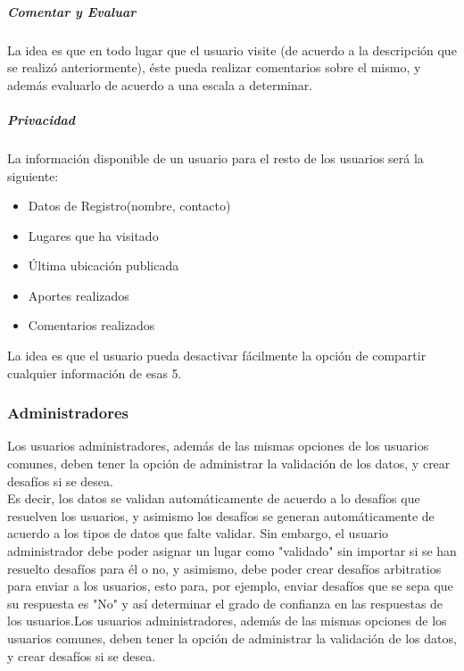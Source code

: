 \documentclass[10pt,letterpaper]{article}
\begin{document}
\subparagraph{Comentar y Evaluar}

La idea es que en todo lugar que el usuario visite (de acuerdo a la descripción que se realizó anteriormente), éste pueda realizar comentarios sobre el mismo, y además evaluarlo de acuerdo a una escala a determinar.\\

\subparagraph{Privacidad}

La información disponible de un usuario para el resto de los usuarios será la siguiente:\\

\begin{itemize}
 \item Datos de Registro(nombre, contacto)
 \item Lugares que ha visitado
 \item Última ubicación publicada
 \item Aportes realizados
 \item Comentarios realizados
\end{itemize}

La idea es que el usuario pueda desactivar fácilmente la opción de compartir cualquier información de esas 5.\\

\subsubsection{Administradores}

Los usuarios administradores, además de las mismas opciones de los usuarios comunes, deben tener la opción de administrar la validación de los datos, y crear desafíos si se desea.\\

Es decir, los datos se validan automáticamente de acuerdo a lo desafíos que resuelven los usuarios, y asimismo los desafíos se generan automáticamente de acuerdo a los tipos de datos que falte validar. Sin embargo, el usuario administrador debe poder asignar un lugar como "validado" sin importar si se han resuelto desafíos para él o no, y asimismo, debe poder crear desafíos arbitratios para enviar a los usuarios, esto para, por ejemplo, enviar desafíos que se sepa que su respuesta es "No" y así determinar el grado de confianza en las respuestas de los usuarios.Los usuarios administradores, además de las mismas opciones de los usuarios comunes, deben tener la opción de administrar la validación de los datos, y crear desafíos si se desea.\\
\end{document}
